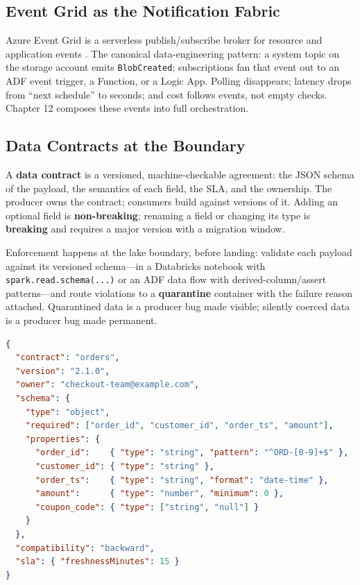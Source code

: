 \subsection{Event Grid as the Notification Fabric}
Azure Event Grid is a serverless publish/subscribe broker for resource and application events \cite{microsoft2025eventGrid}. The canonical data-engineering pattern: a system topic on the storage account emits \texttt{BlobCreated}; subscriptions fan that event out to an ADF event trigger, a Function, or a Logic App. Polling disappears; latency drops from ``next schedule'' to seconds; and cost follows events, not empty checks. Chapter 12 composes these events into full orchestration.

\subsection{Data Contracts at the Boundary}
A \textbf{data contract} is a versioned, machine-checkable agreement: the JSON schema of the payload, the semantics of each field, the SLA, and the ownership. The producer owns the contract; consumers build against versions of it. Adding an optional field is \textbf{non-breaking}; renaming a field or changing its type is \textbf{breaking} and requires a major version with a migration window.

Enforcement happens at the lake boundary, before landing: validate each payload against its versioned schema---in a Databricks notebook with \texttt{spark.read.schema(...)} or an ADF data flow with derived-column/assert patterns---and route violations to a \textbf{quarantine} container with the failure reason attached. Quarantined data is a producer bug made visible; silently coerced data is a producer bug made permanent.

\begin{lstlisting}[language=json,caption={A versioned contract (excerpt) with a breaking-change policy.},label={lst:ch11-contract}]
{
  "contract": "orders",
  "version": "2.1.0",
  "owner": "checkout-team@example.com",
  "schema": {
    "type": "object",
    "required": ["order_id", "customer_id", "order_ts", "amount"],
    "properties": {
      "order_id":    { "type": "string", "pattern": "^ORD-[0-9]+$" },
      "customer_id": { "type": "string" },
      "order_ts":    { "type": "string", "format": "date-time" },
      "amount":      { "type": "number", "minimum": 0 },
      "coupon_code": { "type": ["string", "null"] }
    }
  },
  "compatibility": "backward",
  "sla": { "freshnessMinutes": 15 }
}
\end{lstlisting}

